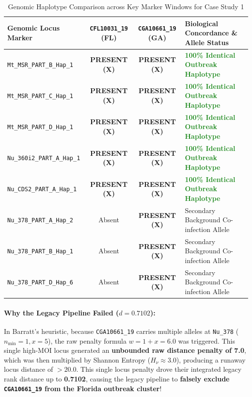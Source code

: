 \documentclass[11pt,a4paper]{article}
\begin{document}
\begin{table}[h]
\centering
\small
\caption{Genomic Haplotype Comparison across Key Marker Windows for Case Study 1}
\label{tab:allele_profile}
\begin{tabularx}{\textwidth}{l c c X}
\toprule
\textbf{Genomic Locus Marker} & \textbf{\texttt{CFL10031\_19} (FL)} & \textbf{\texttt{CGA10661\_19} (GA)} & \textbf{Biological Concordance \& Allele Status} \\
\midrule
\texttt{Mt\_MSR\_PART\_B\_Hap\_1} & \textbf{PRESENT (X)} & \textbf{PRESENT (X)} & \textcolor{ForestGreen}{\textbf{100\% Identical Outbreak Haplotype}} \\
\texttt{Mt\_MSR\_PART\_C\_Hap\_1} & \textbf{PRESENT (X)} & \textbf{PRESENT (X)} & \textcolor{ForestGreen}{\textbf{100\% Identical Outbreak Haplotype}} \\
\texttt{Mt\_MSR\_PART\_D\_Hap\_1} & \textbf{PRESENT (X)} & \textbf{PRESENT (X)} & \textcolor{ForestGreen}{\textbf{100\% Identical Outbreak Haplotype}} \\
\texttt{Nu\_360i2\_PART\_A\_Hap\_1} & \textbf{PRESENT (X)} & \textbf{PRESENT (X)} & \textcolor{ForestGreen}{\textbf{100\% Identical Outbreak Haplotype}} \\
\texttt{Nu\_CDS2\_PART\_A\_Hap\_1} & \textbf{PRESENT (X)} & \textbf{PRESENT (X)} & \textcolor{ForestGreen}{\textbf{100\% Identical Outbreak Haplotype}} \\
\texttt{Nu\_378\_PART\_A\_Hap\_2} & Absent & \textbf{PRESENT (X)} & Secondary Background Co-infection Allele \\
\texttt{Nu\_378\_PART\_B\_Hap\_1} & Absent & \textbf{PRESENT (X)} & Secondary Background Co-infection Allele \\
\texttt{Nu\_378\_PART\_D\_Hap\_6} & Absent & \textbf{PRESENT (X)} & Secondary Background Co-infection Allele \\
\bottomrule
\end{tabularx}
\end{table}

\paragraph{Why the Legacy Pipeline Failed ($d = 0.7102$):}
In Barratt's heuristic, because \texttt{CGA10661\_19} carries multiple alleles at \texttt{Nu\_378} ($n_{\text{min}} = 1, x = 5$), the raw penalty formula $w = 1 + x = 6.0$ was triggered. This single high-MOI locus generated an \textbf{unbounded raw distance penalty of 7.0}, which was then multiplied by Shannon Entropy ($H_\nu \approx 3.0$), producing a runaway locus distance of $>20.0$. This single locus penalty drove their integrated legacy rank distance up to \textbf{0.7102}, causing the legacy pipeline to \textbf{falsely exclude \texttt{CGA10661\_19} from the Florida outbreak cluster}!
\end{document}
